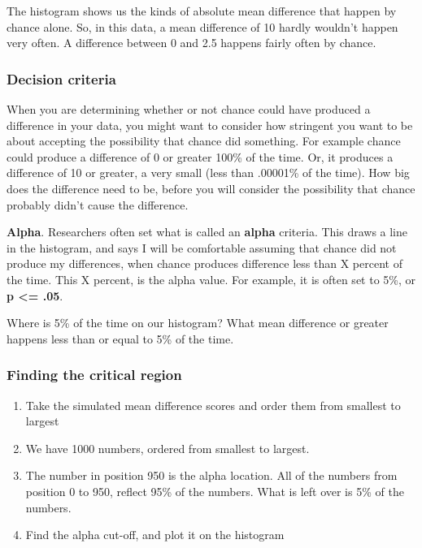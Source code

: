 \documentclass[
]{book}
\providecommand{\tightlist}{%
  \setlength{\itemsep}{0pt}\setlength{\parskip}{0pt}}
\begin{document}
The histogram shows us the kinds of absolute mean difference that happen by chance alone. So, in this data, a mean difference of 10 hardly wouldn't happen very often. A difference between 0 and 2.5 happens fairly often by chance.

\hypertarget{decision-criteria}{%
\subsubsection{Decision criteria}\label{decision-criteria}}

When you are determining whether or not chance could have produced a difference in your data, you might want to consider how stringent you want to be about accepting the possibility that chance did something. For example chance could produce a difference of 0 or greater 100\% of the time. Or, it produces a difference of 10 or greater, a very small (less than .00001\% of the time). How big does the difference need to be, before you will consider the possibility that chance probably didn't cause the difference.

\textbf{Alpha}. Researchers often set what is called an \textbf{alpha} criteria. This draws a line in the histogram, and says I will be comfortable assuming that chance did not produce my differences, when chance produces difference less than X percent of the time. This X percent, is the alpha value. For example, it is often set to 5\%, or \textbf{p \textless= .05}.

Where is 5\% of the time on our histogram? What mean difference or greater happens less than or equal to 5\% of the time.

\hypertarget{finding-the-critical-region}{%
\subsubsection{Finding the critical region}\label{finding-the-critical-region}}

\begin{enumerate}
\def\labelenumi{\arabic{enumi}.}
\tightlist
\item
  Take the simulated mean difference scores and order them from smallest to largest
\item
  We have 1000 numbers, ordered from smallest to largest.
\item
  The number in position 950 is the alpha location. All of the numbers from position 0 to 950, reflect 95\% of the numbers. What is left over is 5\% of the numbers.
\item
  Find the alpha cut-off, and plot it on the histogram
\end{enumerate}
\end{document}
